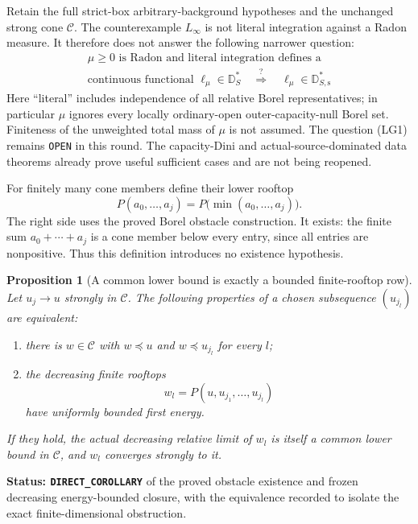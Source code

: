 \documentclass[11pt,a4paper]{article}
\numberwithin{equation}{section}
\newtheorem{proposition}[theorem]{Proposition}
\theoremstyle{definition}
\theoremstyle{remark}
\begin{document}
Retain the full strict-box arbitrary-background hypotheses and
the unchanged strong cone $\mathscr C$.  The counterexample
$L_\infty$ is not literal integration against a Radon measure.
It therefore does not answer the following narrower question:
\[
 \begin{gathered}
 \mu\ge0\text{ is Radon and literal integration defines a}\\
 \text{continuous functional }\ell_\mu\in\mathbb D_S^*
 \quad\overset{?}{\Longrightarrow}\quad
                   \ell_\mu\in\mathbb D_{S,\mathrm s}^*
 \end{gathered}
 \tag{LG1}
\]
Here ``literal'' includes independence of all relative Borel
representatives; in particular $\mu$ ignores every locally
ordinary-open outer-capacity-null Borel set.  Finiteness of the
unweighted total mass of $\mu$ is not assumed.  The question
\textup{(LG1)} remains \texttt{OPEN} in this round.  The
capacity-Dini and actual-source-dominated data theorems already
prove useful sufficient cases and are not being reopened.

For finitely many cone members define their lower rooftop
\[
       P(a_0,\ldots,a_j)=P\bigl(\min(a_0,\ldots,a_j)\bigr).
 \tag{LG2}
\]
The right side uses the proved Borel obstacle construction.
It exists: the finite sum $a_0+\cdots+a_j$ is a cone member
below every entry, since all entries are nonpositive.
Thus this definition introduces no existence hypothesis.

\begin{proposition}[A common lower bound is exactly a bounded finite-rooftop row]
\label{prop:r12-finite-rooftop-common-bound}
Let $u_j\to u$ strongly in $\mathscr C$.  The following
properties of a chosen subsequence $(u_{j_l})$ are equivalent:
\begin{enumerate}
\item there is $w\in\mathscr C$ with
$w\preceq u$ and $w\preceq u_{j_l}$ for every $l$;
\item the decreasing finite rooftops
\[
              w_l=P(u,u_{j_1},\ldots,u_{j_l})
 \tag{LG3}
\]
have uniformly bounded first energy.
\end{enumerate}
If they hold, the actual decreasing relative limit of
$w_l$ is itself a common lower bound in $\mathscr C$,
and $w_l$ converges strongly to it.
\end{proposition}

\noindent\textbf{Status: \texttt{DIRECT\_COROLLARY}}
of the proved obstacle existence and frozen decreasing
energy-bounded closure, with the equivalence recorded
to isolate the exact finite-dimensional obstruction.
\end{document}
